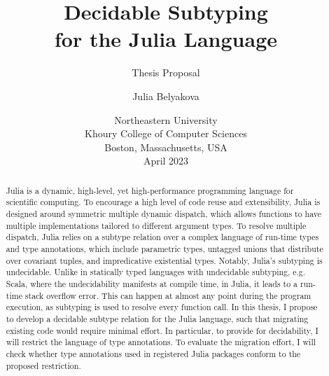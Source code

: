\title{Decidable Subtyping\\for the Julia Language}
\subtitle{Thesis Proposal}

\author{Julia Belyakova}

\date{\normalsize%
Northeastern University\\
Khoury College of Computer Sciences\\
Boston, Massachusetts, USA\\
April 2023
}

\maketitle


\begin{abstract}

Julia is a dynamic, high-level, yet high-performance programming language
for scientific computing.
To encourage a high level of code reuse and extensibility, Julia is
designed around symmetric multiple dynamic dispatch, which allows functions
to have multiple implementations tailored to different argument types.
To resolve multiple dispatch, Julia relies on a subtype relation over a complex
language of run-time types and type annotations, which include parametric types,
untagged unions that distribute over covariant tuples, and impredicative
existential types.
Notably, Julia's subtyping is undecidable.
Unlike in statically typed languages
with undecidable subtyping, e.g. Scala, where the undecidability manifests at
compile time, in Julia, it leads to a run-time stack overflow error. 
This can happen
at almost any point during the program execution, as subtyping is used to
resolve every function call.
In this thesis, I propose to develop a decidable subtype relation
for the Julia language,
such that migrating existing code would require minimal effort.
In particular, to provide for decidability, I will restrict the language of type
annotations. To evaluate the migration effort, I will check whether
type annotations used in registered Julia packages conform to the proposed
restriction.

\end{abstract}
